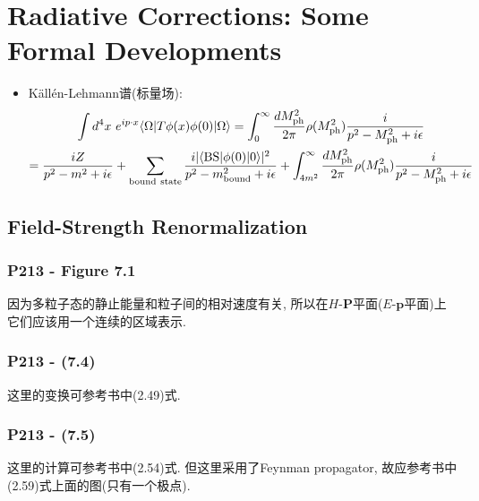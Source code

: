 \chapter{Radiative Corrections: Some Formal Developments}

\begin{itemize}
  \item Källén-Lehmann谱(标量场):
        \begin{gather*}
          \int d^4x\ e^{ip\cdot x}\langle \Omega |T\phi(x)\phi(0)|\Omega \rangle = \int_0^\infty \frac{dM_{\rm ph}^2}{2\pi}\rho(M_{\rm ph}^2)\frac{i}{p^2-M_{\rm ph}^2+i\epsilon} \\
          = \frac{iZ}{p^2-m^2+i\epsilon} + \sum_{\rm bound\ state}\frac{i|\langle {\rm BS}|\phi(0)|0\rangle|^2}{p^2-m_{\rm bound}^2+i\epsilon} + \int_{4m^2}^\infty \frac{dM_{\rm ph}^2}{2\pi}\rho(M_{\rm ph}^2)\frac{i}{p^2-M_{\rm ph}^2+i\epsilon}
        \end{gather*}


\end{itemize}
\pagestyle{general}

\section{Field-Strength Renormalization}

\subsection{P213 - Figure 7.1}

因为多粒子态的静止能量和粒子间的相对速度有关, 所以在$H$-$\mathbf{P}$平面($E$-$\mathbf{p}$平面)上它们应该用一个连续的区域表示.

\subsection{P213 - (7.4)}

这里的变换可参考书中(2.49)式.

\subsection{P213 - (7.5)}

这里的计算可参考书中(2.54)式.
但这里采用了Feynman propagator, 故应参考书中(2.59)式上面的图(只有一个极点).

